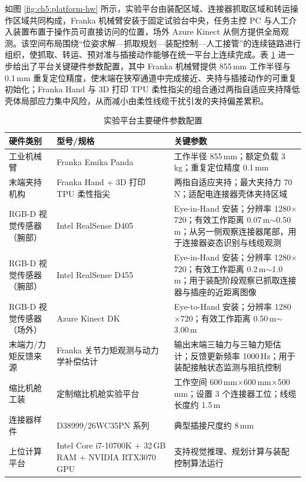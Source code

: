 如图 \ref{fig:ch5:platform-hw} 所示，实验平台由装配区域、连接器抓取区域和转运操作区域共同构成，Franka 机械臂安装于固定试验台中央，任务主控 PC 与人工介入装置布置于操作员可直接访问的位置，场外 Azure Kinect 从侧方提供全局观测。该空间布局围绕“位姿求解—抓取规划—装配控制—人工接管”的连续链路进行组织，使抓取、转运、预对准与插接动作能够在统一平台上连续完成。表 \ref{tab:ch5:hw-params} 进一步给出了平台关键硬件参数配置，其中 Franka 机械臂提供 855\,mm 工作半径与 0.1\,mm 重复定位精度，使末端在狭窄通道中完成接近、夹持与插接动作的可重复初始化；Franka Hand 与 3D 打印 TPU 柔性指尖的组合通过两指自适应夹持降低壳体局部应力集中风险，从而减小由柔性线缆干扰引发的夹持偏差累积。

\begin{table}[htbp]
  \centering
  \caption{实验平台主要硬件参数配置}
  \label{tab:ch5:hw-params}
  \begin{tabular}{|p{2.2cm}|p{3.0cm}|p{8.9cm}|}
    \hline
    硬件类别 & 型号/规格 & 关键参数 \\
    \hline
    工业机械臂 & Franka Emika Panda & 工作半径 855\,mm；额定负载 3\,kg；重复定位精度 0.1\,mm \\
    \hline
    末端夹持机构 & Franka Hand + 3D 打印 TPU 柔性指尖 & 两指自适应夹持；最大夹持力 70\,N；适配电连接器壳体夹持区域 \\
    \hline
    RGB-D 视觉传感器（腕部） & Intel RealSense D405 & Eye-in-Hand 安装；分辨率 1280$\times$720；有效工作距离 0.07\,m$\sim$0.50\,m；从另一侧观察连接器尾部，用于连接器姿态识别与线缆观测 \\
    \hline
    RGB-D 视觉传感器（腕部） & Intel RealSense D455 & Eye-in-Hand 安装；分辨率 1280$\times$720；有效工作距离 0.2\,m$\sim$1.0\,m；用于装配阶段观察已抓取连接器与插座的近距离图像 \\
    \hline
    RGB-D 视觉传感器（场外） & Azure Kinect DK & Eye-to-Hand 安装；分辨率 1280$\times$720；有效工作距离 0.50\,m$\sim$3.00\,m \\
    \hline
    末端力/力矩反馈来源 & Franka 关节力矩观测与动力学补偿估计 & 输出末端三轴力与三轴力矩估计；反馈更新频率 1000\,Hz；用于装配接触状态监测与阻抗控制 \\
    \hline
    缩比机舱工装 & 定制缩比机舱实验平台 & 工作空间 600\,mm$\times$600\,mm$\times$500\,mm；设置 3 个连接器工位；线缆长度约 1.5\,m \\
    \hline
    连接器样件 & D38999/26WC35PN 系列 & 典型插接尺度约 8\,mm \\
    \hline
    上位计算平台 & Intel Core i7-10700K + 32\,GB RAM + NVIDIA RTX3070 GPU & 支持视觉推理、规划计算与装配控制算法运行 \\
    \hline
  \end{tabular}
\end{table}

